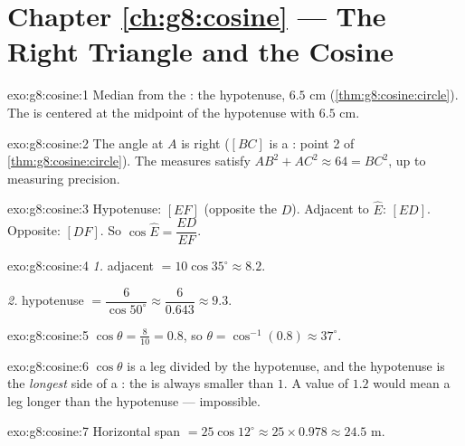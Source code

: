 \section*{Chapter \ref{ch:g8:cosine} --- The Right Triangle and the Cosine}

\begin{solution}{exo:g8:cosine:1}
Median from the :  the hypotenuse, $6.5$ cm
(\cref{thm:g8:cosine:circle}). The  is centered
at the midpoint of the hypotenuse with  $6.5$ cm.
\end{solution}

\begin{solution}{exo:g8:cosine:2}
The angle at $A$ is right ($[BC]$ is a : point 2 of
\cref{thm:g8:cosine:circle}). The measures satisfy
$AB^2 + AC^2 \approx 64 = BC^2$, up to measuring precision.
\end{solution}

\begin{solution}{exo:g8:cosine:3}
Hypotenuse: $[EF]$ (opposite the  $D$). Adjacent to
$\widehat E$: $[ED]$. Opposite: $[DF]$. So
$\cos\widehat E = \dfrac{ED}{EF}$.
\end{solution}

\begin{solution}{exo:g8:cosine:4}
\emph{1.} adjacent $= 10 \cos 35^\circ \approx 8.2$.

\emph{2.} hypotenuse $= \dfrac{6}{\cos 50^\circ} \approx
\dfrac{6}{0.643} \approx 9.3$.
\end{solution}

\begin{solution}{exo:g8:cosine:5}
$\cos\theta = \frac{8}{10} = 0.8$, so
$\theta = \cos^{-1}(0.8) \approx 37^\circ$.
\end{solution}

\begin{solution}{exo:g8:cosine:6}
$\cos\theta$ is a leg divided by the hypotenuse, and the hypotenuse
is the \emph{longest} side of a : the  is
always smaller than $1$. A value of $1.2$ would mean a leg longer
than the hypotenuse --- impossible.
\end{solution}

\begin{solution}{exo:g8:cosine:7}
Horizontal span $= 25 \cos 12^\circ \approx 25 \times 0.978 \approx
24.5$ m.
\end{solution}

